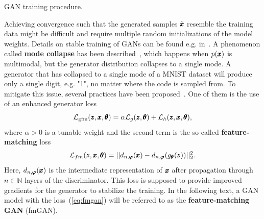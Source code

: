 \begin{algorithm}

\caption{GAN training procedure.}
\label{alg:gan_train}
\end{algorithm}

Achieving convergence such that the generated samples $\tilde{\pmb{{x}}}$ resemble the training data might be difficult and require multiple random initializations of the model weights. Details on stable training of GANs can be found e.g. in~\cite{gui2021review}. A phenomenon called \textbf{mode collapse} has been described~\cite{goodfellow2016nips}, which happens when $p(\pmb{{x}})$ is multimodal, but the generator distribution collapses to a single mode. A generator that has collapsed to a single mode of a MNIST dataset will produce only a single digit, e.g. "1", no matter where the code is sampled from. To mitigate this issue, several practices have been proposed~\cite{salimans2016fmgan,hong2019generative}. One of them is the use of an enhanced generator loss
\begin{equation} \label{eq:fmgan}
\mathcal{L}_{\text{gfm}}(\pmb{{z}},\pmb{{x}},\pmb{{\theta}})=\alpha\mathcal{L}_{g}(\pmb{{z}},\pmb{{\theta}})+\mathcal{L}_{h}(\pmb{{z}},\pmb{{x}},\pmb{{\theta}}),
\end{equation}
where $\alpha > 0$ is a tunable weight and the second term is the so-called \textbf{feature-matching} loss
\begin{equation} \label{eq:fm_loss}
\mathcal{L}_{fm}(\pmb{{z}},\pmb{{x}},\pmb{{\theta}}) = ||d_{n,\pmb{{\varphi}}}(\pmb{{x}})-d_{n,\pmb{{\varphi}}}(g_{\pmb{{\theta}}}(\pmb{{z}}))||_{2}^{2}.
\end{equation}
Here, $d_{n,\pmb{{\varphi}}}(\pmb{{x}})$ is the intermediate representation of $\pmb{{x}}$ after propagation through $n \in \mathbb{N}$ layers of the discriminator. This loss is supposed to provide improved gradients for the generator to stabilize the training. In the following text, a GAN model with the loss~(\ref{eq:fmgan}) will be referred to as the \textbf{feature-matching GAN} (fmGAN).

